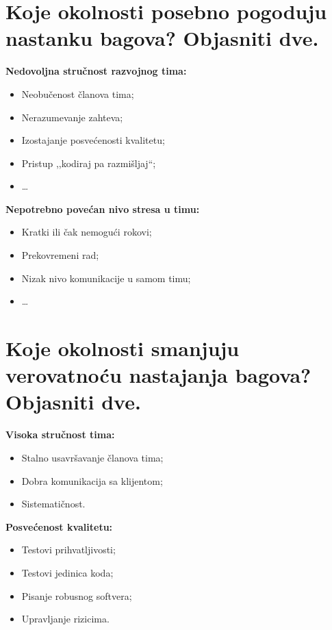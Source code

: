 \documentclass[a4paper]{article}
\begin{document}
\section{Koje okolnosti posebno pogoduju nastanku bagova? Objasniti dve.}
  \noindent \textbf{Nedovoljna stručnost razvojnog tima:}
  \begin{itemize}
    \item Neobučenost članova tima;
    \item Nerazumevanje zahteva;
    \item Izostajanje posvećenosti kvalitetu;
    \item Pristup ,,kodiraj pa razmišljaj``;
    \item \dots
  \end{itemize}
  \textbf{Nepotrebno povećan nivo stresa u timu:}
  \begin{itemize}
    \item Kratki ili čak nemogući rokovi;
    \item Prekovremeni rad;
    \item Nizak nivo komunikacije u samom timu;
    \item \dots
  \end{itemize}

\section{Koje okolnosti smanjuju verovatnoću nastajanja bagova? Objasniti dve.}
  \noindent \textbf{Visoka stručnost tima:}
  \begin{itemize}
    \item Stalno usavršavanje članova tima;
    \item Dobra komunikacija sa klijentom;
    \item Sistematičnost.
  \end{itemize}
  \textbf{Posvećenost kvalitetu:}
  \begin{itemize}
    \item Testovi prihvatljivosti;
    \item Testovi jedinica koda;
    \item Pisanje robusnog softvera;
    \item Upravljanje rizicima.
  \end{itemize}
\end{document}
